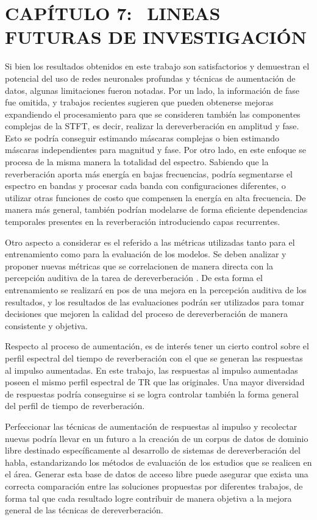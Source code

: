 \section[Lineas futuras de investigación]{CAPÍTULO 7:$\ \ \ \ $LINEAS FUTURAS DE INVESTIGACIÓN} 

Si bien los resultados obtenidos en este trabajo son satisfactorios y demuestran el potencial del uso de redes neuronales profundas y técnicas de aumentación de datos, algunas limitaciones fueron notadas. Por un lado, la información de fase fue omitida, y trabajos recientes sugieren que pueden obtenerse mejoras expandiendo el procesamiento para que se consideren también las componentes complejas de la STFT, es decir, realizar la dereverberación en amplitud y fase. Esto se podría conseguir estimando máscaras complejas o bien estimando máscaras independientes para magnitud y fase. Por otro lado, en este enfoque se procesa de la misma manera la totalidad del espectro. Sabiendo que la reverberación aporta más energía en bajas frecuencias, podría segmentarse el espectro en bandas y procesar cada banda con configuraciones diferentes, o utilizar otras funciones de costo que compensen la energía en alta frecuencia. De manera más general, también podrían modelarse de forma eficiente dependencias temporales presentes en la reverberación introduciendo capas recurrentes.

Otro aspecto a considerar es el referido a las métricas utilizadas tanto para el entrenamiento como para la evaluación de los modelos. Se deben analizar y proponer nuevas métricas que se correlacionen de manera directa con la percepción auditiva de la tarea de dereverberación \cite{CDPAM}. De esta forma el entrenamiento se realizará en pos de una mejora en la percepción auditiva de los resultados, y los resultados de las evaluaciones podrán ser utilizados para tomar decisiones que mejoren la calidad del proceso de dereverberación de manera consistente y objetiva.

Respecto al proceso de aumentación, es de interés tener un cierto control sobre el perfil espectral del tiempo de reverberación con el que se generan las respuestas al impulso aumentadas. En este trabajo, las respuestas al impulso aumentadas poseen el mismo perfil espectral de TR que las originales. Una mayor diversidad de respuestas podría conseguirse si se logra controlar también la forma general del perfil de tiempo de reverberación. 

Perfeccionar las técnicas de aumentación de respuestas al impulso y recolectar nuevas podría llevar en un futuro a la creación de un corpus de datos de dominio libre destinado específicamente al desarrollo de sistemas de dereverberación del habla, estandarizando los métodos de evaluación de los estudios que se realicen en el área. Generar esta base de datos de acceso libre puede asegurar que exista una correcta comparación entre las soluciones propuestas por diferentes trabajos, de forma tal que cada resultado logre contribuir de manera objetiva a la mejora general de las técnicas de dereverberación. 